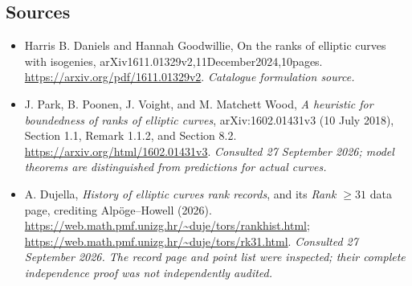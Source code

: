 \documentclass[11pt,a4paper]{article}
\numberwithin{equation}{section}
\begin{document}
\subsection{Sources}
\begin{itemize}\raggedright
\item[\textnormal{[S1]}]\hypertarget{source:30006731:1}{} Harris B. Daniels and Hannah Goodwillie, On the ranks of elliptic curves with isogenies, arXiv1611.01329v2,11December2024,10pages.
\url{https://arxiv.org/pdf/1611.01329v2}.
{\small\textit{Catalogue formulation source.}}
\item[\textnormal{[E1]}]\hypertarget{extra:30006731:1}{} J. Park, B. Poonen,
J. Voight, and M. Matchett Wood, \emph{A heuristic for boundedness of ranks
of elliptic curves}, arXiv:1602.01431v3 (10 July 2018),
Section 1.1, Remark 1.1.2, and Section 8.2.
\url{https://arxiv.org/html/1602.01431v3}.
{\small\textit{Consulted 27 September 2026; model theorems are distinguished from predictions for actual curves.}}
\item[\textnormal{[E2]}]\hypertarget{extra:30006731:2}{} A. Dujella,
\emph{History of elliptic curves rank records}, and its
\emph{Rank $\geq31$} data page, crediting Alp\"oge--Howell (2026).
\url{https://web.math.pmf.unizg.hr/~duje/tors/rankhist.html};
\url{https://web.math.pmf.unizg.hr/~duje/tors/rk31.html}.
{\small\textit{Consulted 27 September 2026. The record page and point list were inspected; their complete independence proof was not independently audited.}}
\end{itemize}
\end{document}
